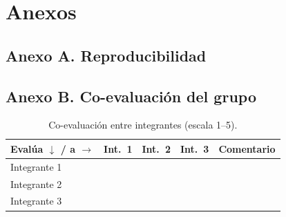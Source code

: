 \documentclass[12pt, a4paper]{article}
\begin{document}
\section{Anexos}
\subsection*{Anexo A. Reproducibilidad}
\subsection*{Anexo B. Co-evaluación del grupo}
\begin{table}[H]
\centering
\caption{Co-evaluación entre integrantes (escala 1--5).}
\small
\renewcommand{\arraystretch}{1.4}
\begin{tabular}{@{}p{3.2cm}*{3}{c}p{3.5cm}@{}}
\toprule
\textbf{Evalúa $\downarrow$ / a $\rightarrow$} & \textbf{Int.\ 1} & \textbf{Int.\ 2} & \textbf{Int.\ 3} & \textbf{Comentario} \\
\midrule
Integrante 1 & & & & \\
Integrante 2 & & & & \\
Integrante 3 & & & & \\
\bottomrule
\end{tabular}
\end{table}



\end{document}
